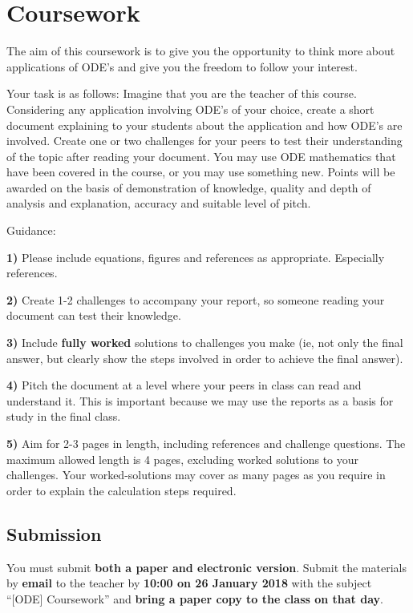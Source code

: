 \newpage
\section{Coursework}
The aim of this coursework is to give you the opportunity to think more about applications of ODE's and give you the freedom to follow your interest.

Your task is as follows:
Imagine that you are the teacher of this course.
Considering any application involving ODE's of your choice, create a short document explaining to your students about the application and how ODE's are involved.
Create one or two challenges for your peers to test their understanding of the topic after reading your document.
You may use ODE mathematics that have been covered in the course, or you may use something new.
Points will be awarded on the basis of demonstration of knowledge, quality and depth of analysis and explanation, accuracy and suitable level of pitch.

Guidance:

\textbf{1)} Please include equations, figures and references as appropriate. Especially references.

\textbf{2)} Create 1-2 challenges to accompany your report, so someone reading your document can test their knowledge.

\textbf{3)} Include \textbf{fully worked} solutions to challenges you make (ie, not only the final answer, but clearly show the steps involved in order to achieve the final answer).

\textbf{4)} Pitch the document at a level where your peers in class can read and understand it. This is important because we may use the reports as a basis for study in the final class.

\textbf{5)} Aim for 2-3 pages in length, including references and challenge questions. The maximum allowed length is 4 pages, excluding worked solutions to your challenges. Your worked-solutions may cover as many pages as you require in order to explain the calculation steps required.

\subsection{Submission}
You must submit \textbf{both a paper and electronic version}. Submit the materials by \textbf{email} to the teacher by \textbf{10:00 on 26 January 2018} with the subject ``[ODE] Coursework'' and \textbf{bring a paper copy to the class on that day}.

